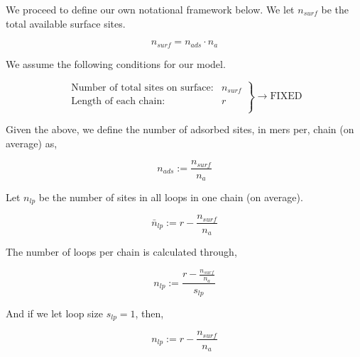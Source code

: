 \documentclass[10pt,letterpaper]{article}
\begin{document}
\noindent We proceed to define our own notational framework below. We let $n_{surf}$ be the total available surface sites.

\begin{equation}
	\boxed{n_{surf}=n_{ads}\cdotp n_{a}}
	\label{nsurf}
\end{equation}

\noindent We assume the following conditions for our model.

$$
\boxed{
    \left. %
        \begin{array}{ll}
            \text{Number of total sites on surface:} & n_{surf}\\
            \text{Length of each chain:}& r\\
        \end{array}
    \right\}
    \rightarrow\text{FIXED}
}
$$




\noindent Given the above, we define the number of adsorbed sites, in mers per, chain (on average) as,

\begin{equation}
	\boxed{n_{ads}:= \frac{n_{surf}}{n_a}}
	\label{nads}
\end{equation}


\noindent Let $n_{lp}$ be the number of sites in all loops 
in one chain (on average).

\begin{equation}
	\boxed{\bar{n}_{lp}:=r-\frac{n_{surf}}{n_a}}
	\label{mean nlp}
\end{equation}


\noindent The number of loops per 
chain is calculated through,


\begin{equation}
	\boxed{n_{lp}:= \frac{r-\frac{n_{surf}}{n_a}}{s_{lp}}}
	\label{nlp,Gen}
\end{equation}


\noindent And if we let loop size $s_{lp}=1$, then,


\begin{equation}
\boxed{n_{lp}:= r-\frac{n_{surf}}{n_a}}
\label{nlp}
\end{equation}

%
\end{document}
